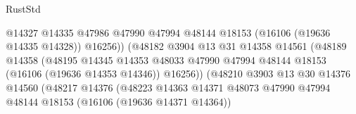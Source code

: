 \begin{lexlean}{RustStd}
\begin{coremodule}
                                                  @14327
                                                  @14335
                                                  @47986
                                                  @47990
                                                  @47994
                                                  @48144
                                                  @18153
                                                  (@16106 (@19636 @14335 @14328))
                                                  @16256))
                                              (@48182
                                                @3904
                                                @13
                                                @31
                                                @14358
                                                @14561
                                                (@48189
                                                  @14358
                                                  (@48195
                                                    @14345
                                                    @14353
                                                    @48033
                                                    @47990
                                                    @47994
                                                    @48144
                                                    @18153
                                                    (@16106 (@19636 @14353 @14346))
                                                    @16256))
                                                (@48210
                                                  @3903
                                                  @13
                                                  @30
                                                  @14376
                                                  @14560
                                                  (@48217
                                                    @14376
                                                    (@48223
                                                      @14363
                                                      @14371
                                                      @48073
                                                      @47990
                                                      @47994
                                                      @48144
                                                      @18153
                                                      (@16106 (@19636 @14371 @14364))

\end{coremodule}
\end{lexlean}
